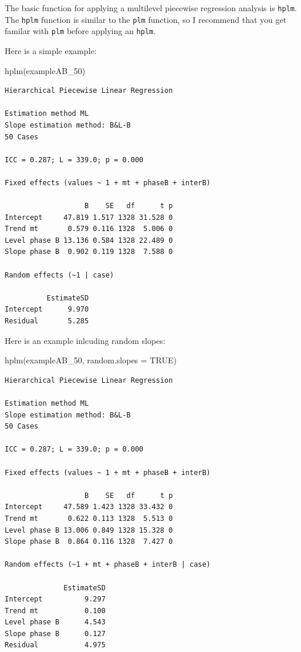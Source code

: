 \documentclass[
]{book}
\newenvironment{Shaded}{\begin{snugshade}}{\end{snugshade}}
\newcommand{\AttributeTok}[1]{\textcolor[rgb]{0.77,0.63,0.00}{#1}}
\newcommand{\ConstantTok}[1]{\textcolor[rgb]{0.00,0.00,0.00}{#1}}
\newcommand{\FunctionTok}[1]{\textcolor[rgb]{0.00,0.00,0.00}{#1}}
\newcommand{\NormalTok}[1]{#1}
\begin{document}
The basic function for applying a multilevel piecewise regression analysis is \texttt{hplm}. The \texttt{hplm} function is similar to the \texttt{plm} function, so I recommend that you get familar with \texttt{plm} before applying an \texttt{hplm}.

Here is a simple example:

\begin{Shaded}
\begin{Highlighting}[]
\FunctionTok{hplm}\NormalTok{(exampleAB\_50)}
\end{Highlighting}
\end{Shaded}

\begin{verbatim}
Hierarchical Piecewise Linear Regression

Estimation method ML 
Slope estimation method: B&L-B 
50 Cases

ICC = 0.287; L = 339.0; p = 0.000

Fixed effects (values ~ 1 + mt + phaseB + interB)

                   B    SE   df      t p
Intercept     47.819 1.517 1328 31.528 0
Trend mt       0.579 0.116 1328  5.006 0
Level phase B 13.136 0.584 1328 22.489 0
Slope phase B  0.902 0.119 1328  7.588 0

Random effects (~1 | case)

          EstimateSD
Intercept      9.970
Residual       5.285
\end{verbatim}

Here is an example inlcuding random slopes:

\begin{Shaded}
\begin{Highlighting}[]
\FunctionTok{hplm}\NormalTok{(exampleAB\_50, }\AttributeTok{random.slopes =} \ConstantTok{TRUE}\NormalTok{)}
\end{Highlighting}
\end{Shaded}

\begin{verbatim}
Hierarchical Piecewise Linear Regression

Estimation method ML 
Slope estimation method: B&L-B 
50 Cases

ICC = 0.287; L = 339.0; p = 0.000

Fixed effects (values ~ 1 + mt + phaseB + interB)

                   B    SE   df      t p
Intercept     47.589 1.423 1328 33.432 0
Trend mt       0.622 0.113 1328  5.513 0
Level phase B 13.006 0.849 1328 15.328 0
Slope phase B  0.864 0.116 1328  7.427 0

Random effects (~1 + mt + phaseB + interB | case)

              EstimateSD
Intercept          9.297
Trend mt           0.100
Level phase B      4.543
Slope phase B      0.127
Residual           4.975
\end{verbatim}
\end{document}
